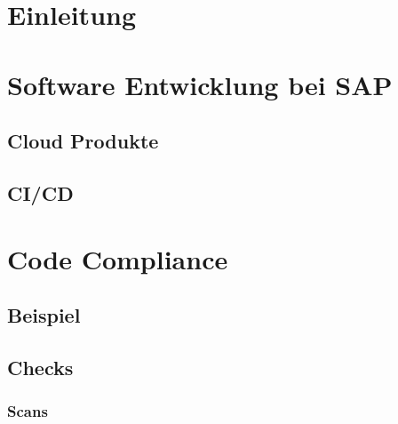 \documentclass[
	12pt, %
	a4paper,
	bibliography=totoc, %
	numbers=noenddot, %
	ngerman, %
	headsepline, %
	oneside %
	]{scrbook} %
\begin{document}


\printnoidxglossaries{}

\clearpage



\chapter{Einleitung}\label{ch:einleitung}


\chapter{Software Entwicklung bei SAP}\label{ch:sap_software_entwicklung}


\section{Cloud Produkte}\label{sec:cloud}


\section{CI/CD}\label{sec:cicd}


\chapter{Code Compliance}\label{ch:code_compliance}


\section{Beispiel}\label{sec:compliance_beispiele}


\section{Checks}\label{se~:checks}


\subsection{Scans}\label{subsec:scans}

\end{document}
